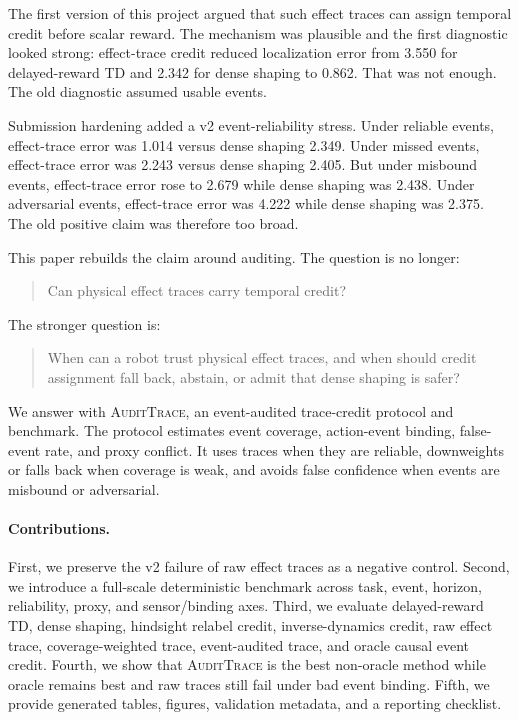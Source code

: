\documentclass{article}
\newcommand{\method}{\textsc{AuditTrace}\xspace}
\begin{document}
The first version of this project argued that such effect traces can assign temporal credit before scalar reward. The mechanism was plausible and the first diagnostic looked strong: effect-trace credit reduced localization error from 3.550 for delayed-reward TD and 2.342 for dense shaping to 0.862. That was not enough. The old diagnostic assumed usable events.

Submission hardening added a v2 event-reliability stress. Under reliable events, effect-trace error was 1.014 versus dense shaping 2.349. Under missed events, effect-trace error was 2.243 versus dense shaping 2.405. But under misbound events, effect-trace error rose to 2.679 while dense shaping was 2.438. Under adversarial events, effect-trace error was 4.222 while dense shaping was 2.375. The old positive claim was therefore too broad.

This paper rebuilds the claim around auditing. The question is no longer:
\begin{quote}
Can physical effect traces carry temporal credit?
\end{quote}
The stronger question is:
\begin{quote}
When can a robot trust physical effect traces, and when should credit assignment fall back, abstain, or admit that dense shaping is safer?
\end{quote}

We answer with \method, an event-audited trace-credit protocol and benchmark. The protocol estimates event coverage, action-event binding, false-event rate, and proxy conflict. It uses traces when they are reliable, downweights or falls back when coverage is weak, and avoids false confidence when events are misbound or adversarial.

\paragraph{Contributions.}
First, we preserve the v2 failure of raw effect traces as a negative control. Second, we introduce a full-scale deterministic benchmark across task, event, horizon, reliability, proxy, and sensor/binding axes. Third, we evaluate delayed-reward TD, dense shaping, hindsight relabel credit, inverse-dynamics credit, raw effect trace, coverage-weighted trace, event-audited trace, and oracle causal event credit. Fourth, we show that \method is the best non-oracle method while oracle remains best and raw traces still fail under bad event binding. Fifth, we provide generated tables, figures, validation metadata, and a reporting checklist.
\end{document}

